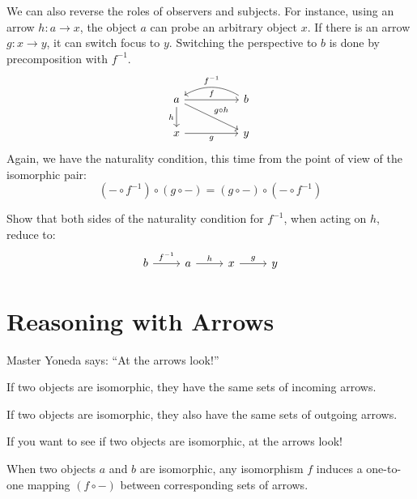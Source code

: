 \documentclass[DaoFP]{subfiles}
\begin{document}
We can also reverse the roles of observers and subjects. For instance, using an arrow $h \colon a \to x$, the object $a$ can probe an arbitrary object $x$. If there is an arrow $g \colon x \to y$, it can switch focus to $y$. Switching the perspective to $b$ is done by precomposition with $f^{-1}$.
\[
 \begin{tikzcd}
 a
 \arrow[rr, "f"]
 \arrow[d, "h"']
 \arrow[rrd, "g\circ h"]
 && b
  \arrow[ll, bend right,  "f^{-1}"']
 \\
 x
 \arrow[rr, "g"']
  && y
 \end{tikzcd}
\]
Again, we have the naturality condition, this time from the point of view of the isomorphic pair:
\[(- \circ f^{-1}) \circ (g \circ -) = (g \circ -) \circ (- \circ f^{-1}) \]

\begin{exercise}
Show that both sides of the naturality condition for $f^{-1}$, when acting on $h$, reduce to:
\[
 \begin{tikzcd}
 b \arrow[r, "f^{-1}"] &a \arrow[r, "h"] & x \arrow[r, "g"] & y
\end{tikzcd}
\]

\end{exercise}

\section{Reasoning with Arrows}

Master Yoneda says: ``At the arrows look!''

If two objects are isomorphic, they have the same sets of incoming arrows. 

If two objects are isomorphic, they also have the same sets of outgoing arrows.

If you want to see if two objects are isomorphic, at the arrows look!

\medskip

When two objects $a$ and $b$ are isomorphic, any isomorphism $f$ induces a one-to-one mapping $(f \circ -)$ between corresponding sets of arrows.  
\end{document}
